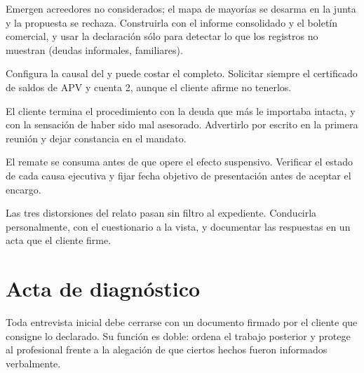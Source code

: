 \bloqueErrores

{Emergen acreedores no considerados; el mapa de mayorías se desarma en la junta y la
propuesta se rechaza.}
{Construirla con el informe consolidado y el boletín comercial, y usar la declaración
sólo para detectar lo que los registros no muestran (deudas informales, familiares).}

{Configura la causal del   y puede costar el \discharge{} completo.}
{Solicitar siempre el certificado de saldos de APV y cuenta 2, aunque el cliente afirme
no tenerlos.}

{El cliente termina el procedimiento con la deuda que más le importaba intacta, y con la
sensación de haber sido mal asesorado.}
{Advertirlo por escrito en la primera reunión y dejar constancia en el mandato.}

{El remate se consuma antes de que opere el efecto suspensivo.}
{Verificar el estado de cada causa ejecutiva y fijar fecha objetivo de presentación
antes de aceptar el encargo.}

{Las tres distorsiones del relato pasan sin filtro al expediente.}
{Conducirla personalmente, con el cuestionario a la vista, y documentar las respuestas
en un acta que el cliente firme.}

\section{Acta de diagnóstico}

Toda entrevista inicial debe cerrarse con un documento firmado por el cliente que
consigne lo declarado. Su función es doble: ordena el trabajo posterior y protege al
profesional frente a la alegación de que ciertos hechos fueron informados verbalmente.

